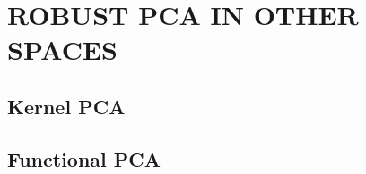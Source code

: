 \section*{\sffamily \Large ROBUST PCA IN OTHER SPACES}
\label{section:Others}

\subsection*{\sffamily \large Kernel PCA}

\subsection*{\sffamily \large Functional PCA}